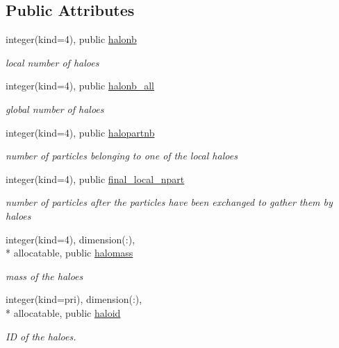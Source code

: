 \subsection*{Public Attributes}
\begin{DoxyCompactItemize}
\item 
integer(kind=4), public \hyperlink{classmodhalo_aa38fb84fd13087a625a48555740b9f2d}{halonb}
\begin{DoxyCompactList}\small\item\em local number of haloes \end{DoxyCompactList}\item 
integer(kind=4), public \hyperlink{classmodhalo_ad416ab5cda1e3a837e8392415f305ffd}{halonb\-\_\-all}
\begin{DoxyCompactList}\small\item\em global number of haloes \end{DoxyCompactList}\item 
integer(kind=4), public \hyperlink{classmodhalo_aa2c5c12e5bd7198d5571d7ff832ffa38}{halopartnb}
\begin{DoxyCompactList}\small\item\em number of particles belonging to one of the local haloes \end{DoxyCompactList}\item 
integer(kind=4), public \hyperlink{classmodhalo_aea1cd3a6f28ec75795cb930326cc2744}{final\-\_\-local\-\_\-npart}
\begin{DoxyCompactList}\small\item\em number of particles after the particles have been exchanged to gather them by haloes \end{DoxyCompactList}\item 
integer(kind=4), dimension(\-:), \\*
allocatable, public \hyperlink{classmodhalo_ad235215a443e0871d790576ff1ad77c2}{halomass}
\begin{DoxyCompactList}\small\item\em mass of the haloes \end{DoxyCompactList}\item 
integer(kind=pri), dimension(\-:), \\*
allocatable, public \hyperlink{classmodhalo_a123a9c168d495f9bbe3d1e25be025105}{haloid}
\begin{DoxyCompactList}\small\item\em I\-D of the haloes. \end{DoxyCompactList}\item 

\end{DoxyCompactItemize}
